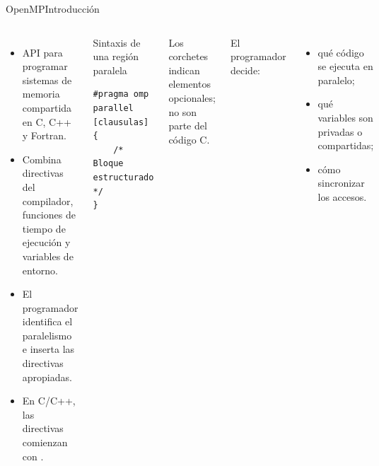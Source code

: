 \documentclass[aspectratio=169,10pt]{beamer}
\newcommand{\code}[1]{\texttt{\detokenize{#1}}}
\newcommand{\smallnote}[1]{\par{\scriptsize\color{muted}#1\par}}
\begin{document}
\begin{frame}[fragile]{OpenMP}{Introducción}
\small
\begin{columns}[T,onlytextwidth]
  \begin{itemize}[<+->]\setlength\itemsep{4pt}
    \item API para programar sistemas de \alert{memoria compartida} en C, C++ y Fortran.
    \item Combina directivas del compilador, funciones de tiempo de ejecución y variables de entorno.
    \item El programador identifica el paralelismo e inserta las directivas apropiadas.
    \item En C/C++, las directivas comienzan con \code{#pragma omp}.
  \end{itemize}
  \begin{block}{Sintaxis de una región paralela}
\begin{lstlisting}
#pragma omp parallel [clausulas]
{
    /* Bloque estructurado */
}
\end{lstlisting}
  \end{block}
  \smallnote{Los corchetes indican elementos opcionales; no son parte del código C.}
  \par\vspace{3mm}
  El programador decide:
  \begin{itemize}[<+->]\setlength\itemsep{4pt}
    \item qué código se ejecuta en paralelo;
    \item qué variables son privadas o compartidas;
    \item cómo sincronizar los accesos.
  \end{itemize}
\end{columns}
\end{frame}
\end{document}
